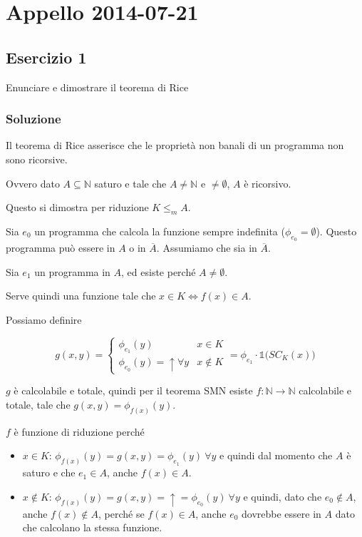 \section{Appello 2014-07-21}

\subsection{Esercizio 1}

Enunciare e dimostrare il teorema di Rice

\subsubsection{Soluzione}

Il teorema di Rice asserisce che le proprietà non banali di un programma non sono ricorsive.

Ovvero dato $A \subseteq \mathbb{N}$ saturo e tale che $A \neq \mathbb{N}$ e $\neq \emptyset$, $A$ è ricorsivo.

Questo si dimostra per riduzione $K \leq_m A$.

Sia $e_0$ un programma che calcola la funzione sempre indefinita ($\phi_{e_0} = \emptyset$). Questo programma può essere in $A$ o in $\overline{A}$. Assumiamo che sia in $\overline{A}$.

Sia $e_1$ un programma in $A$, ed esiste perché $A \neq \emptyset$.

Serve quindi una funzione tale che $x \in K \Leftrightarrow f(x) \in A$.

Possiamo definire

$$
g(x,y) = \begin{cases}
\phi_{e_1}(y) &x \in K \\
\phi_{e_0}(y) = \uparrow \forall y&x \notin K
\end{cases} = \phi_{e_1} \cdot \mathbb{1}\big(SC_K(x)\big)
$$ 

$g$ è calcolabile e totale, quindi per il teorema SMN esiste $f : \mathbb{N} \rightarrow \mathbb{N}$ calcolabile e totale, tale che $g(x,y) = \phi_{f(x)}(y)$.

$f$ è funzione di riduzione perché

\begin{itemize}
	\item $x \in K$: $\phi_{f(x)}(y) = g(x,y) = \phi_{e_1}(y) \: \forall y $ e quindi dal momento che $A$ è saturo e che $e_1 \in A$, anche $f(x) \in A$.
	\item $x \notin K$: $\phi_{f(x)}(y) = g(x,y)  = \uparrow=\phi_{e_0}(y)\: \forall y $ e quindi, dato che $e_0 \notin A$, anche $f(x) \notin A$, perché se $f(x) \in A$, anche $e_0$ dovrebbe essere in $A$ dato che calcolano la stessa funzione. 
\end{itemize}

